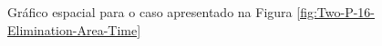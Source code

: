 \documentclass{article}
\begin{document}
	\begin{figure}[h]
		\centering
		\qquad
		\caption{Gráfico espacial para o caso apresentado na Figura \ref{fig:Two-P-16-Elimination-Area-Time}}
		\label{fig:Two-P-18-Elimination-Area-Space}
	\end{figure}	
	
\end{document}
